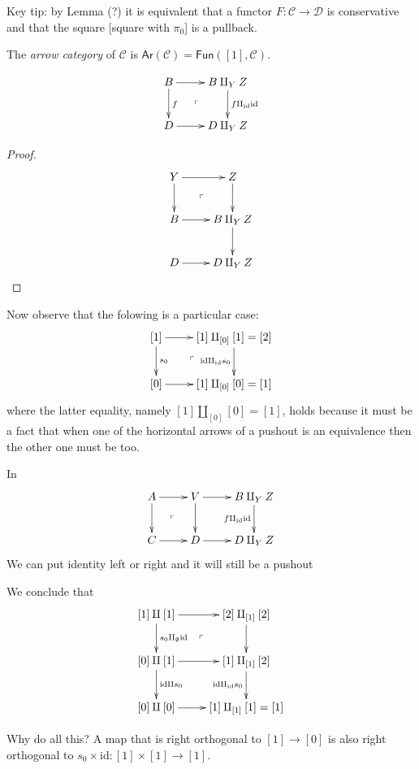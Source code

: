Key tip: by Lemma (?) it is equivalent that
a functor $F: \mathcal{C} \to \mathcal{D}$ is
conservative and
that the square [square with $\pi_0$] is a
pullback.

\begin{definition}
\label{definition-arrow-category}
The {\it arrow category} of $\mathcal{C}$ is
$\mathsf{Ar}(\mathcal{C})=\mathsf{Fun}([1],
\mathcal{C})$.
\end{definition}

\begin{lemma}
\label{lemma-1}
$$
\xymatrix{
B\ar[r]\ar[d]^f\ar@{}[dr]|-{\ulcorner}&B
\amalg_YZ\ar[d]^
{f\amalg_{\text{id}}\text{id}}\\
D\ar[r]&D \amalg_YZ
}
$$
\end{lemma}

\begin{proof}
$$
\xymatrix{
Y\ar[r]\ar[d]\ar@{}[dr]|-{\ulcorner}&Z\ar[d]
\\
B\ar[r]&B\amalg_YZ\ar[d]\\
D\ar[r]&D\amalg_YZ
}
$$
\end{proof}

Now observe that the folowing
is a particular case:
$$
\xymatrix{
[1]\ar[r]\ar[d]^{s_0}\ar@{}[dr]|-{\ulcorner}&
[1]\amalg_{[0]}[1]=[2]\ar[d]
_{\text{id}\amalg_{\text{id}}s_0}\\
[0]\ar[r]&[1]\amalg_{[0]}[0]=[1]
}
$$
where the latter equality,
namely $[1]\amalg_{[0]}[0]=[1]$,
holds because it must be a fact that
when one of the horizontal arrows of a
pushout
is an equivalence then the other one must be
too.

\begin{lemma}
\label{lemma-2}
In
$$
\xymatrix{
A\ar[r]\ar[d]\ar@{}[dr]|-{\ulcorner}&V\ar[d]
\ar[r]&
B\amalg_YZ\ar[d]_{f\amalg_{\text{id}}
\text{id}}\\
C\ar[r]&D\ar[r]&D\amalg_YZ
}
$$
We can put identity left or right and it will
still be a pushout
\end{lemma}

We conclude that
$$
\xymatrix{
[1]\amalg [1]\ar[r]\ar[d]^{s_0
\amalg_{\emptyset}\text{id}}
\ar@{}[dr]|-{\ulcorner}&[2]\amalg_{[1]}[2]
\ar[d]\\
[0]\amalg[1]\ar[d]^{\text{id}\amalg
s_0}\ar[r]&[1]\amalg_{[1]}[2]
\ar[d]_{\text{id} \amalg_{\text{id}}s_0}\\
[0]\amalg[0]\ar[r]&[1]\amalg_{[1]}[1]=[1]
}
$$

Why do all this? A map that is right
orthogonal
to $[1]\to[0]$ is also right orthogonal
to $s_0\times \text{id}:[1]\times[1]\to[1]$.

